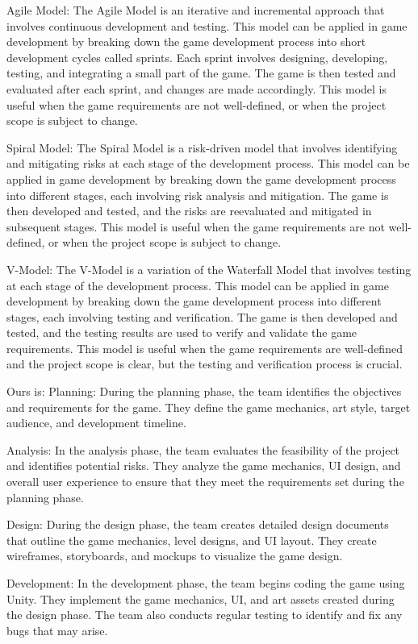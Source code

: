 \documentclass[12pt]{report}
\begin{document}
Agile Model: The Agile Model is an iterative and incremental approach that involves continuous development and testing. This model can be applied in game development by breaking down the game development process into short development cycles called sprints. Each sprint involves designing, developing, testing, and integrating a small part of the game. The game is then tested and evaluated after each sprint, and changes are made accordingly. This model is useful when the game requirements are not well-defined, or when the project scope is subject to change.

Spiral Model: The Spiral Model is a risk-driven model that involves identifying and mitigating risks at each stage of the development process. This model can be applied in game development by breaking down the game development process into different stages, each involving risk analysis and mitigation. The game is then developed and tested, and the risks are reevaluated and mitigated in subsequent stages. This model is useful when the game requirements are not well-defined, or when the project scope is subject to change.

V-Model: The V-Model is a variation of the Waterfall Model that involves testing at each stage of the development process. This model can be applied in game development by breaking down the game development process into different stages, each involving testing and verification. The game is then developed and tested, and the testing results are used to verify and validate the game requirements. This model is useful when the game requirements are well-defined and the project scope is clear, but the testing and verification process is crucial.

Ours is:
Planning: During the planning phase, the team identifies the objectives and requirements for the game. They define the game mechanics, art style, target audience, and development timeline.

Analysis: In the analysis phase, the team evaluates the feasibility of the project and identifies potential risks. They analyze the game mechanics, UI design, and overall user experience to ensure that they meet the requirements set during the planning phase.

Design: During the design phase, the team creates detailed design documents that outline the game mechanics, level designs, and UI layout. They create wireframes, storyboards, and mockups to visualize the game design.

Development: In the development phase, the team begins coding the game using Unity. They implement the game mechanics, UI, and art assets created during the design phase. The team also conducts regular testing to identify and fix any bugs that may arise.
\end{document}
